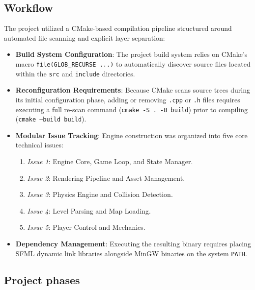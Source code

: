 \documentclass[12pt, a4paper]{article}
\begin{document}
\subsection{Workflow}

The project utilized a CMake-based compilation pipeline structured around automated file scanning and explicit layer separation:
\begin{itemize}
\item \textbf{Build System Configuration}: The project build system relies on CMake's macro \texttt{file(GLOB\_RECURSE ...)} to automatically discover source files located within the \texttt{src\/} and \texttt{include\/} directories.
\item \textbf{Reconfiguration Requirements}: Because CMake scans source trees during its initial configuration phase, adding or removing \texttt{.cpp} or \texttt{.h} files requires executing a full re-scan command (\texttt{cmake -S . -B build}) prior to compiling (\texttt{cmake --build build}).
\item \textbf{Modular Issue Tracking}: Engine construction was organized into five core technical issues:
\begin{enumerate}
\item \textit{Issue 1}: Engine Core, Game Loop, and State Manager.
\item \textit{Issue 2}: Rendering Pipeline and Asset Management.
\item \textit{Issue 3}: Physics Engine and Collision Detection.
\item \textit{Issue 4}: Level Parsing and Map Loading.
\item \textit{Issue 5}: Player Control and Mechanics.
\end{enumerate}
\item \textbf{Dependency Management}: Executing the resulting binary requires placing SFML dynamic link libraries alongside MinGW binaries on the system \texttt{PATH}.
\end{itemize}

\newpage

\subsection{Project phases}
\end{document}
